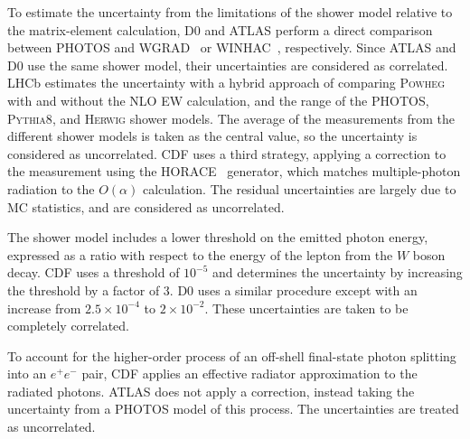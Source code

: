 To estimate the uncertainty from the limitations of the shower model relative to the 
matrix-element calculation, D0 and ATLAS perform a direct comparison between PHOTOS 
and WGRAD~\cite{Baur:1998kt,Baur:2004ig} or WINHAC~\cite{Placzek:2003zg,Placzek:2009jy,Placzek:2013moa}, 
respectively.  Since ATLAS and D0 use the same shower model, their uncertainties are 
considered as correlated.  LHCb estimates the uncertainty with a hybrid approach of 
comparing \textsc{Powheg} with and without the NLO EW calculation, and the range of 
the PHOTOS, \textsc{Pythia8}, and \textsc{Herwig} shower models.  The average of the 
measurements from the different shower models is taken as the central value, so the 
uncertainty is considered as uncorrelated.  CDF uses a third strategy, applying a 
correction to the measurement using the 
HORACE~\cite{CarloniCalame:2003ux,CarloniCalame:2006zq,CarloniCalame:2007cd} 
generator, which matches multiple-photon radiation to the $O(\alpha)$ calculation.
The residual uncertainties are largely due to MC statistics, and are considered as 
uncorrelated.

The shower model includes a lower threshold on the emitted photon energy, expressed 
as a ratio with respect to the energy of the lepton from the $W$ boson decay.  
CDF uses a threshold of $10^{-5}$ and determines the uncertainty by increasing 
the threshold by a factor of 3.  D0 uses a similar procedure except with an increase 
from $2.5 \times 10^{-4}$ to $2 \times 10^{-2}$.  These uncertainties are taken to be 
completely correlated.

To account for the higher-order process of an off-shell final-state photon 
splitting into an $e^+ e^-$ pair, CDF applies an effective radiator 
approximation to the radiated photons.  ATLAS does not apply a correction, 
instead taking the uncertainty from a PHOTOS model of this process.  
The uncertainties are treated as uncorrelated.
